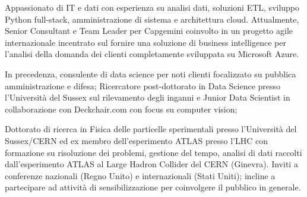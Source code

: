 
Appassionato di IT e dati con esperienza su analisi dati, soluzioni ETL, sviluppo Python full-stack, amministrazione di sistema e architettura cloud. Attualmente, Senior Consultant e Team Leader per Capgemini coinvolto in un progetto agile internazionale incentrato sul fornire una soluzione di business intelligence per l'analisi della domanda dei clienti completamente sviluppata su Microsoft Azure.

In precedenza, consulente di data science per noti clienti focalizzato su pubblica amministrazione e difesa; Ricercatore post-dottorato in Data Science presso l'Università del Sussex sul rilevamento degli inganni e Junior Data Scientist in collaborazione con Deckchair.com con focus su computer vision;

Dottorato di ricerca in Fisica delle particelle sperimentali presso l'Università del Sussex/CERN ed ex membro dell'esperimento ATLAS presso l'LHC con formazione su risoluzione dei problemi, gestione del tempo, analisi di dati raccolti dall'esperimento ATLAS al Large Hadron Collider del CERN (Ginevra). Inviti a conferenze nazionali (Regno Unito) e internazionali (Stati Uniti); incline a partecipare ad attività di sensibilizzazione per coinvolgere il pubblico in generale.